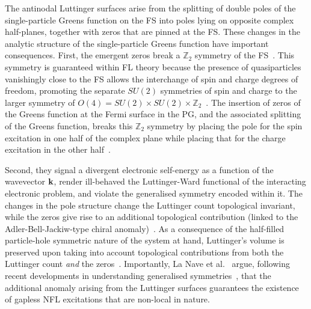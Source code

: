 The antinodal Luttinger surfaces arise from the splitting of double poles of the single-particle Greens function on the FS into poles lying on opposite complex half-planes, together with zeros that are pinned at the FS. These changes in the analytic structure of the single-particle Greens function have important consequences. First, the emergent zeros break a $\mathbb{Z}_{2}$ symmetry of the FS~\cite{Anderson2001,Huang2022,lanave2025}. This symmetry is guaranteed within FL theory because the presence of quasiparticles vanishingly close to the FS allows the interchange of spin and charge degrees of freedom, promoting the separate $SU(2)$ symmetries of spin and charge to the larger symmetry of $O(4) = SU(2) \times SU(2) \times \mathbb{Z}_2$~\cite{Anderson2001}. The insertion of zeros of the Greens function at the Fermi surface in the PG, and the associated splitting of the Greens function, breaks this $\mathbb{Z}_{2}$ symmetry by placing the pole for the spin excitation in one half of the complex plane while placing that for the charge excitation in the other half~\cite{su2025anomalies,Huang2022}.

Second, they signal a divergent electronic self-energy as a function of the wavevector ${\bf k}$, render ill-behaved the Luttinger-Ward functional of the interacting electronic problem, and violate the generalised symmetry encoded within it. The changes in the pole structure change the Luttinger count topological invariant, while the zeros give rise to an additional topological contribution (linked to the Adler-Bell-Jackiw-type chiral anomaly)~\cite{adler1969axial,bell1969pcac,Altshuler_1998,calderon2025}. As a consequence of the half-filled particle-hole symmetric nature of the system at hand, Luttinger's volume is preserved upon taking into account topological contributions from both the Luttinger count {\it and} the zeros~\cite{seki2017topological}. Importantly, La Nave et al.~\cite{lanave2025} argue, following recent developments in understanding generalised symmetries~\cite{Casini2021Symmetries}, that the additional anomaly arising from the Luttinger surfaces guarantees the existence of gapless NFL excitations that are non-local in nature.  


